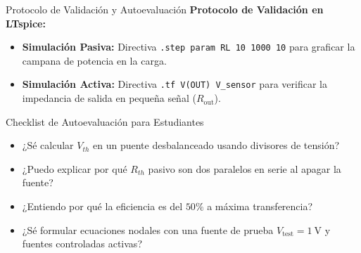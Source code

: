 \documentclass[aspectratio=169, 10pt]{beamer}
\begin{document}
\begin{frame}{Protocolo de Validación y Autoevaluación}
    \textbf{Protocolo de Validación en LTspice:}
    \begin{itemize}
        \item \textbf{Simulación Pasiva:} Directiva \texttt{.step param RL 10 1000 10} para graficar la campana de potencia en la carga.
        \item \textbf{Simulación Activa:} Directiva \texttt{.tf V(OUT) V\_sensor} para verificar la impedancia de salida en pequeña señal ($R_{\text{out}}$).
    \end{itemize}

    \vspace{0.2cm}
    \begin{block}{Checklist de Autoevaluación para Estudiantes}
        \begin{itemize}
            \item[$\square$] ¿Sé calcular $V_{th}$ en un puente desbalanceado usando divisores de tensión?
            \item[$\square$] ¿Puedo explicar por qué $R_{th}$ pasivo son dos paralelos en serie al apagar la fuente?
            \item[$\square$] ¿Entiendo por qué la eficiencia es del $50\%$ a máxima transferencia?
            \item[$\square$] ¿Sé formular ecuaciones nodales con una fuente de prueba $V_{\text{test}} = \qty{1}{\volt}$ y fuentes controladas activas?
        \end{itemize}
    \end{block}
\end{frame}
\end{document}
